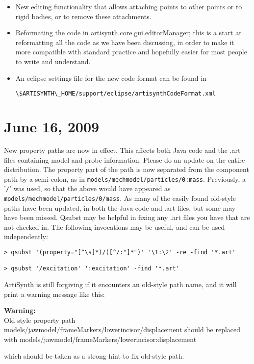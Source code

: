 \documentclass{article}
\begin{document}
\begin{itemize}

\item New editing functionality that allows attaching points to other
points or to rigid bodies, or to remove these attachments.

\item Reformating the code in artisynth.core.gui.editorManager; this is a 
start at reformatting all the code as we have been discussing, in
order to make it more compatible with standard practice and hopefully 
easier for most people to write and understand.

\item An eclipse settings file for the new code format can be found in
\begin{verbatim}
\$ARTISYNTH\_HOME/support/eclipse/artisynthCodeFormat.xml
\end{verbatim}

\end{itemize}

\section*{June 16, 2009}

New property paths are now in effect. This affects both Java code and 
the .art files containing model and probe information. Please do an 
update on the entire distribution. The property part of the path is
now separated from the component path by a semi-colon, as in 
{\tt models/mechmodel/particles/0:mass}. Previously, a '{\tt /}' was used, 
so that the above would have appeared as 
{\tt models/mechmodel/particles/0/mass}. As many of the easily found
old-style paths have been updated, in both the Java code and .art
files, but some may have been missed. Qsubst may be helpful in fixing 
any .art files you have that are not checked in. The following 
invocations may be useful, and can be used independently:

\begin{lstlisting}[]
> qsubst '(property="[^\s]*)/([^/:"]*")' '\1:\2' -re -find '*.art'

> qsubst '/excitation' ':excitation' -find '*.art'
\end{lstlisting}

ArtiSynth is still forgiving if it encounters an old-style path name, 
and it will print a warning message like this: 
\begin{sideblock}
{\bf Warning:}\\
Old style 
property path models/jawmodel/frameMarkers/lowerincisor/displacement 
should be replaced with 
models/jawmodel/frameMarkers/lowerincisor:displacement
\end{sideblock}
which should 
be taken as a strong hint to fix old-style path.
\end{document}
